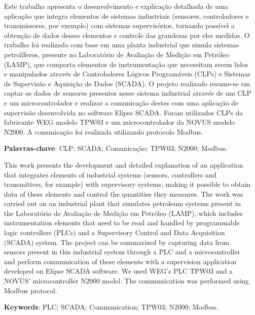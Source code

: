 

Este trabalho apresenta o desenvolvimento e explicação detalhada de uma aplicação que integra elementos de sistemas industriais (sensores, controladores e transmissores, por exemplo) com sistemas supervisórios, tornando possível a obtenção de dados desses elementos e controle das grandezas por eles medidas. O trabalho foi realizado com base em uma planta industrial que simula sistemas petrolíferos, presente no Laboratório de Avaliação de Medição em Petróleo (LAMP), que comporta elementos de instrumentação que necessitam serem lidos e manipulados através de Controladores Lógicos Programáveis (CLPs) e Sistemas de Supervisão e Aquisição de Dados (SCADA). O projeto realizado resume-se em captar os dados de sensores presentes nesse sistema industrial através de um CLP e um microcontrolador e realizar a comunicação destes com uma aplicação de supervisão desenvolvida no software Elipse SCADA. Foram utilizados CLPs da fabricante WEG modelo TPW03 e um microcontrolador da NOVUS modelo N2000. A comunicação foi realizada utilizando protocolo Modbus.



\textbf{Palavras-chave}: CLP; SCADA; Comunicação; TPW03; N2000; Modbus.


This work presents the development and detailed explanation of an application that integrates elements of industrial systems (sensors, controllers and transmitters, for example) with supervisory systems, making it possible to obtain data of these elements and control the quantities they measures. The work was carried out on an industrial plant that simulates petroleum systems present in the Laboratório de Avaliação de Medição em Petróleo (LAMP), which includes instrumentation elements that need to be read and handled by programmable logic controllers (PLCs) and a Supervisory Control and Data Acquisition (SCADA) system. The project can be summarized by capturing data from sensors present in this industrial system through a PLC and a microcontroller and perform communication of these elements with a supervision application developed on Elipse SCADA software. We used WEG's PLC TPW03 and a NOVUS' microcontroller N2000 model. The communication was performed using Modbus protocol.


\textbf{Keywords}: PLC; SCADA; Communication; TPW03; N2000; Modbus.